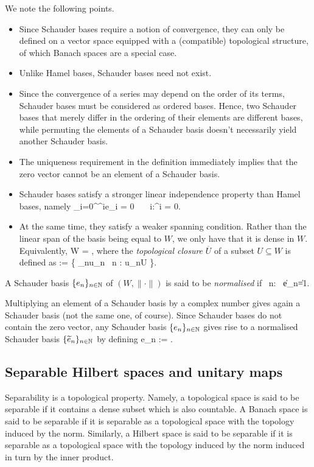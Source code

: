 \noindent We note the following points.
\begin{itemize}
\item Since Schauder bases require a notion of convergence, they can only be defined on a vector space equipped with a (compatible) topological structure, of which Banach spaces are a special case.
\item Unlike Hamel bases, Schauder bases need not exist.
\item Since the convergence of a series may depend on the order of its terms, Schauder bases must be considered as ordered bases. Hence, two Schauder bases that merely differ in the ordering of their elements are different bases, while permuting the elements of a Schauder basis doesn't necessarily  yield another Schauder basis.
\item The uniqueness requirement in the definition immediately implies that the zero vector cannot be an element of a Schauder basis. 
\item Schauder bases satisfy a stronger linear independence property than Hamel bases, namely
\bse
\sum_{i=0}^{\infty}\lambda^ie_i = 0 \ \Rightarrow \ \forall \, i\in \N:\lambda^i = 0.
\ese
\item At the same time, they satisfy a weaker spanning condition. Rather than the linear span of the basis being equal to $W$, we only have that it is dense in $W$. Equivalently,
\bse
W =  ,
\ese
where the \emph{topological closure} $\overline{U}$ of a subset $U\subseteq W$ is defined as
\bse
{} := \bigl\{ \lim_{n\to\infty}u_n \mid \forall \, n \in \N : u_n\in U \bigr\}.
\ese
\end{itemize}

\bd
A Schauder basis $\{e_n\}_{n\in \mathbb{N}}$ of $(W,\|\cdot\|)$ is said to be \emph{normalised} if
\bse
\forall \, n\in \N : \ \|e_n\|=1.
\ese
\ed

Multiplying an element of a Schauder basis by a complex number gives again a Schauder basis (not the same one, of course). Since Schauder bases do not contain the zero vector, any Schauder basis $\{e_n\}_{n\in \mathbb{N}}$ gives rise to a normalised Schauder basis $\{\widetilde e_n\}_{n\in \mathbb{N}}$ by defining
\bse
\widetilde e_n := .
\ese

\subsection{Separable Hilbert spaces and unitary maps}

Separability is a topological property. Namely, a topological space is said to be separable if it contains a dense subset which is also countable. A Banach space is said to be separable if it is separable as a topological space with the topology induced by the norm. Similarly, a Hilbert space is said to be separable if it is separable as a topological space with the topology induced by the norm induced in turn by the inner product.

